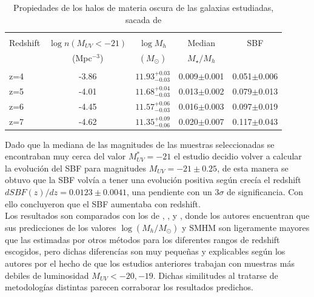 \documentclass{article}
\begin{document}
\begin{table}[h]
\begin{center}
\begin{tabular}{lcccc}
\hline \hline\\
Redshift & $\log n(M_{UV}<-21)$ & $\log M_h$ & Median & SBF \\
	& (Mpc$^{-3}$)& $(M_\odot)$ &	$M_\star/M_h$	&	\\
\hline\\
z=4 & -3.86 & $11.93_{-0.03}^{+0.03}$ & 0.009$\pm$0.001 & 0.051$\pm$0.006\\
z=5 & -4.01 & $11.68_{-0.03}^{+0.04}$ & 0.013$\pm$0.002 & 0.079$\pm$0.013\\
z=6 & -4.45 & $11.57_{-0.03}^{+0.06}$ & 0.016$\pm$0.003 & 0.097$\pm$0.019\\
z=7 & -4.62 & $11.35_{-0.06}^{+0.09}$ & 0.020$\pm$0.007 & 0.117$\pm$0.043\\
\hline
\end{tabular}
\caption{\label{tab:finkelstein2} Propiedades de los halos de materia oscura de las galaxias estudiadas, sacada de \cite{finkelstein2015increasing}}
\end{center}
\end{table}

Dado que la mediana de las magnitudes de las muestras seleccionadas se encontraban muy cerca del valor $M_{UV}^*=-21$ el estudio decidio volver a calcular la evolución del SBF para magnitudes $M_{UV}=-21\pm 0.25$, de esta manera se obtuvo que la SBF volvía a tener una evolución positiva según crecía el redshift $d SBF(z)/dz=0.0123\pm 0.0041$, una pendiente con un $3\sigma$ de significancia. Con ello concluyeron que el SBF aumentaba con redshift.\\

Los resultados son comparados con los de \cite{behroozi2013average}, \cite{barone2014measurement}, \cite{lee2006large} y \cite{overzier2006clustering}, donde los autores encuentran que sus predicciones de los valores $\log(M_h/M_\odot)$ y SMHM son ligeramente mayores que las estimadas por otros métodos para los diferentes rangos de redshift escogidos, pero dichas diferencías son muy pequeñas y explicables según los autores por el hecho de que los estudios anteriores trabajan con muestras más debiles de luminosidad $M_{UV}<-20, -19$. Dichas similitudes al tratarse de metodologías distintas parecen corraborar los resultados predichos. \\
\end{document}
